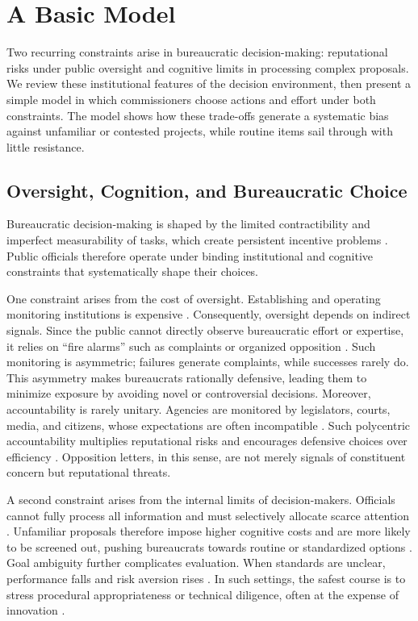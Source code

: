\section{A Basic Model} \label{sec_model}

Two recurring constraints arise in bureaucratic decision-making: reputational risks under public oversight and cognitive limits in processing complex proposals. We review these institutional features of the decision environment, then present a simple model in which commissioners choose actions and effort under both constraints. The model shows how these trade-offs generate a systematic bias against unfamiliar or contested projects, while routine items sail through with little resistance.

\subsection{Oversight, Cognition, and Bureaucratic Choice}

Bureaucratic decision-making is shaped by the limited contractibility and imperfect measurability of tasks, which create persistent incentive problems \citep{Dixit2002}. Public officials therefore operate under binding institutional and cognitive constraints that systematically shape their choices.

One constraint arises from the cost of oversight. Establishing and operating monitoring institutions is expensive \citep{HuberShipan2000,DamonteDunlopRadaelli2014}. Consequently, oversight depends on indirect signals. Since the public cannot directly observe bureaucratic effort or expertise, it relies on ``fire alarms'' such as complaints or organized opposition \citep{Prendergast2003}. Such monitoring is asymmetric; failures generate complaints, while successes rarely do. This asymmetry makes bureaucrats rationally defensive, leading them to minimize exposure by avoiding novel or controversial decisions. Moreover, accountability is rarely unitary. Agencies are monitored by legislators, courts, media, and citizens, whose expectations are often incompatible \citep{Black2008,MaggettiPapadopoulos2018}. Such polycentric accountability multiplies reputational risks and encourages defensive choices over efficiency \citep{CarpenterKrause2012,GiladMaorBloom2015,BusuiocLodge2016}. Opposition letters, in this sense, are not merely signals of constituent concern but reputational threats.

A second constraint arises from the internal limits of decision-makers. Officials cannot fully process all information and must selectively allocate scarce attention \citep{Simon1955,Sims2003,BesleyGhatak2003,HebertWoodford2023}. Unfamiliar proposals therefore impose higher cognitive costs and are more likely to be screened out, pushing bureaucrats towards routine or standardized options \citep{DeFrancescoRadaelliTroeger2012,Jakobsen2020}. Goal ambiguity further complicates evaluation. When standards are unclear, performance falls and risk aversion rises \citep{AndersonStritch2016}. In such settings, the safest course is to stress procedural appropriateness or technical diligence, often at the expense of innovation \citep{Gilad2015,Duvanova2012}.

